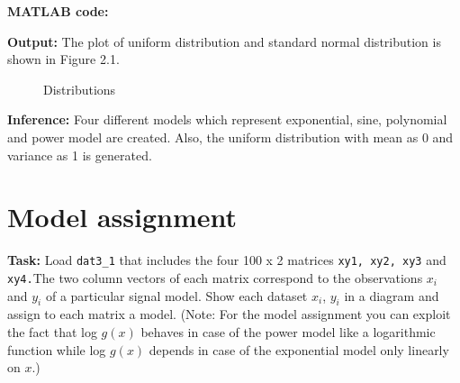 \noindent \textbf{MATLAB code:}

\newpage
\noindent \textbf{Output:}
\noindent The plot of uniform distribution and standard normal distribution is shown in Figure 2.1.
\begin{figure}[H]
    \centering
    \qquad
    \label{fig:example}
    \caption{Distributions}
\end{figure}
\noindent \textbf{Inference:} Four different models which represent exponential, sine, polynomial and power model are created. Also, the uniform distribution with mean as 0 and variance as 1 is generated.


\section{ Model assignment } \label{ Model assignment }
\noindent \textbf{Task:} Load \texttt{dat3\_1} that includes the four 100 x 2 matrices \texttt{xy1, xy2, xy3} and \texttt{xy4.}The two column vectors of each matrix correspond to the observations $x_i$ and $y_i$  of a particular signal model. Show each dataset $x_i$, $y_i$ in a diagram and assign to each matrix a model.
(Note: For the model assignment you can exploit the fact that log $g(x)$ behaves in case of the power model like a logarithmic function while log $g(x)$ depends in case of the exponential model only linearly on $x$.)
 \\

